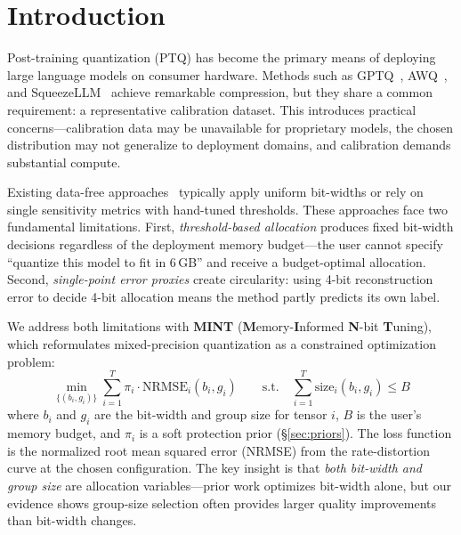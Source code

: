 \documentclass{article}
\begin{document}
\begin{abstract}
hardware. Code is available at \url{https://github.com/baa-ai/MINT} and pre-quantized models at \url{https://huggingface.co/baa-ai}.
\end{abstract}

\section{Introduction}
\label{sec:intro}

Post-training quantization (PTQ) has become the primary means of deploying large language models on consumer hardware. Methods such as GPTQ~\cite{frantar2023gptq}, AWQ~\cite{lin2024awq}, and SqueezeLLM~\cite{kim2024squeezellm} achieve remarkable compression, but they share a common requirement: a representative calibration dataset. This introduces practical concerns---calibration data may be unavailable for proprietary models, the chosen distribution may not generalize to deployment domains, and calibration demands substantial compute.

Existing data-free approaches~\cite{tang2024easyquant,zhang2025mxq,badri2024hqq} typically apply uniform bit-widths or rely on single sensitivity metrics with hand-tuned thresholds. These approaches face two fundamental limitations. First, \emph{threshold-based allocation} produces fixed bit-width decisions regardless of the deployment memory budget---the user cannot specify ``quantize this model to fit in 6\,GB'' and receive a budget-optimal allocation. Second, \emph{single-point error proxies} create circularity: using 4-bit reconstruction error to decide 4-bit allocation means the method partly predicts its own label.

We address both limitations with \textbf{MINT} (\textbf{M}emory-\textbf{I}nformed \textbf{N}-bit \textbf{T}uning), which reformulates mixed-precision quantization as a constrained optimization problem:
\begin{equation}
    \min_{\{(b_i, g_i)\}} \sum_{i=1}^{T} \pi_i \cdot \text{NRMSE}_i(b_i, g_i) \qquad
    \text{s.t.} \quad \sum_{i=1}^{T} \text{size}_i(b_i, g_i) \leq B
    \label{eq:objective}
\end{equation}
where $b_i$ and $g_i$ are the bit-width and group size for tensor $i$, $B$ is the user's memory budget, and $\pi_i$ is a soft protection prior (\S\ref{sec:priors}). The loss function is the normalized root mean squared error (NRMSE) from the rate-distortion curve at the chosen configuration. The key insight is that \emph{both bit-width and group size} are allocation variables---prior work optimizes bit-width alone, but our evidence shows group-size selection often provides larger quality improvements than bit-width changes.
\end{document}
